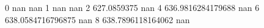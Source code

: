 0 nan nan
1 nan nan
2 627.0859375 nan
4 636.9816284179688 nan
6 638.0584716796875 nan
8 638.7896118164062 nan

